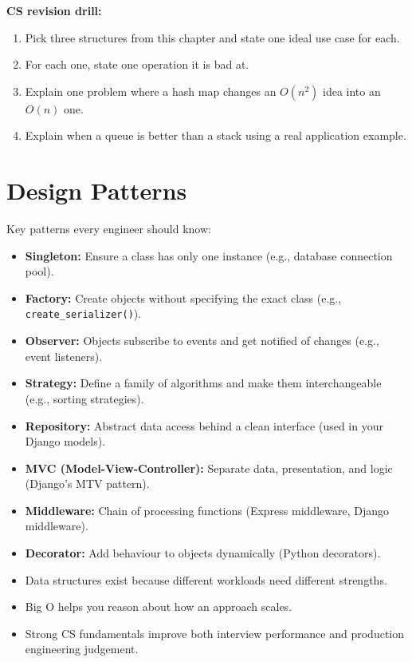 \documentclass[12pt, a4paper, oneside]{book}
\begin{document}
\begin{exercisebox}
\textbf{CS revision drill:}
\begin{enumerate}[leftmargin=2em]
    \item Pick three structures from this chapter and state one ideal use case for each.
    \item For each one, state one operation it is bad at.
    \item Explain one problem where a hash map changes an $O(n^2)$ idea into an $O(n)$ one.
    \item Explain when a queue is better than a stack using a real application example.
\end{enumerate}
\end{exercisebox}

\section{Design Patterns}

Key patterns every engineer should know:

\begin{itemize}[leftmargin=2em]
    \item \textbf{Singleton:} Ensure a class has only one instance (e.g., database connection pool).
    \item \textbf{Factory:} Create objects without specifying the exact class (e.g., \texttt{create\_serializer()}).
    \item \textbf{Observer:} Objects subscribe to events and get notified of changes (e.g., event listeners).
    \item \textbf{Strategy:} Define a family of algorithms and make them interchangeable (e.g., sorting strategies).
    \item \textbf{Repository:} Abstract data access behind a clean interface (used in your Django models).
    \item \textbf{MVC (Model-View-Controller):} Separate data, presentation, and logic (Django's MTV pattern).
    \item \textbf{Middleware:} Chain of processing functions (Express middleware, Django middleware).
    \item \textbf{Decorator:} Add behaviour to objects dynamically (Python decorators).
\end{itemize}

\begin{summarybox}
\begin{itemize}[leftmargin=2em]
    \item Data structures exist because different workloads need different strengths.
    \item Big O helps you reason about how an approach scales.
    \item Strong CS fundamentals improve both interview performance and production engineering judgement.
\end{itemize}
\end{summarybox}
\end{document}
